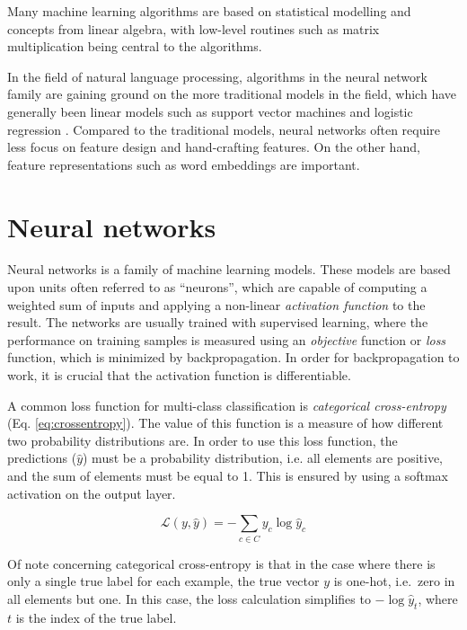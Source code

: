 Many machine learning algorithms are based on statistical modelling and
concepts from linear algebra, with low-level routines such as matrix
multiplication being central to the algorithms.

In the field of natural language processing, algorithms in the neural network
family are gaining ground on the more traditional models in the field, which
have generally been linear models such as support vector machines and
logistic regression \autocite[xvii]{goldbergNLP}. Compared to the traditional
models, neural networks often require less focus on feature design and
hand-crafting features. On the other hand, feature representations such as
word embeddings are important.


\section{Neural networks}

Neural networks is a family of machine learning models. These models are
based upon units often referred to as ``neurons'', which are capable of
computing a weighted sum of inputs and applying a non-linear \emph{activation
function} to the result. The networks are usually trained with supervised
learning, where the performance on training samples is measured using an
\emph{objective} function or \emph{loss} function, which is minimized by
backpropagation. In order for backpropagation to work, it is crucial that the
activation function is differentiable.

A common loss function for multi-class classification is \emph{categorical
cross-entropy} (Eq. \ref{eq:crossentropy}). The value of this function is a
measure of how different two probability distributions are. In order to use
this loss function, the predictions ($\hat y$) must be a probability
distribution, i.e. all elements are positive, and the sum of elements must be
equal to 1. This is ensured by using a softmax activation on the output
layer.

\begin{equation}\label{eq:crossentropy}
  \mathcal{L}(y, {\hat y}) = -\sum_{c\in C} {y_c \log{{\hat y}_c}}
\end{equation}

Of note concerning categorical cross-entropy is that in the case where there
is only a single true label for each example, the true vector $y$ is one-hot,
i.e.\ zero in all elements but one. In this case, the loss calculation
simplifies to $-\log{{\hat y}_t}$, where $t$ is the index of the true label.

